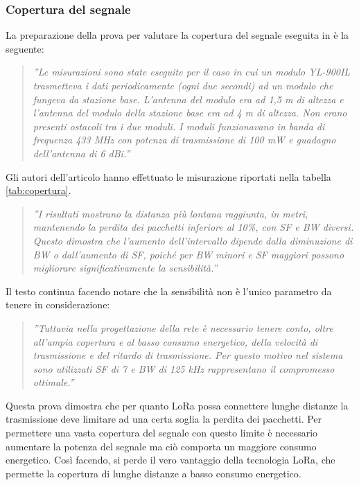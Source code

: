 \documentclass[a4paper]{report} %
\begin{document}
\subsubsection{Copertura del segnale}
La preparazione della prova per valutare la copertura del segnale eseguita in \cite{art:rif.44} è la seguente:
\begin{quote}
	\textit{''Le misurazioni sono state eseguite per il caso in cui un modulo YL-900IL trasmetteva i dati periodicamente (ogni due secondi) ad un modulo che fungeva da stazione base. L'antenna del modulo era ad 1,5 m di altezza e l'antenna del modulo della stazione base era ad 4 m di altezza. Non erano presenti ostacoli tra i due moduli. I moduli funzionavano in banda di frequenza 433 MHz con potenza di trasmissione di 100 mW e guadagno dell'antenna di 6 dBi.''}
\end{quote}
Gli autori dell'articolo \cite{art:rif.44} hanno effettuato le misurazione riportati nella tabella \ref{tab:copertura}. 
\begin{quote}
	\textit{''I risultati mostrano la distanza più lontana raggiunta, in metri, mantenendo la perdita dei pacchetti inferiore al 10\%, con SF e BW diversi. Questo dimostra che l'aumento dell'intervallo dipende dalla diminuzione di BW o dall'aumento di SF, poiché per BW minori e SF maggiori possono migliorare significativamente la sensibilità.''}
\end{quote}
Il testo continua facendo notare che la sensibilità non è l'unico parametro da tenere in considerazione:
\begin{quote}
	\textit{''Tuttavia nella progettazione della rete è necessario tenere conto, oltre all'ampia copertura e al basso consumo energetico, della velocità di trasmissione e del ritardo di trasmissione. Per questo motivo nel sistema sono utilizzati SF di 7 e BW di 125 kHz rappresentano il compromesso ottimale.''}
\end{quote}
Questa prova dimostra che per quanto LoRa possa connettere lunghe distanze la trasmissione deve limitare ad una certa soglia la perdita dei pacchetti. Per permettere una vasta copertura del segnale con questo limite è necessario aumentare la potenza del segnale ma ciò comporta un maggiore consumo energetico. Così facendo, si perde il vero vantaggio della tecnologia LoRa, che permette la copertura di lunghe distanze a basso consumo energetico.  
\end{document}
